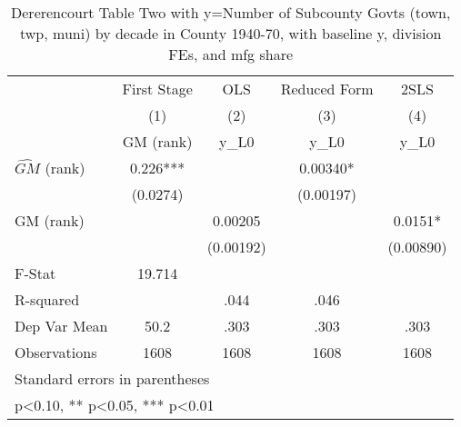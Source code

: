 \begin{table}[htbp]\centering
\def\sym#1{\ifmmode^{#1}\else\(^{#1}\)\fi}
\caption{Dererencourt Table Two with y=Number of Subcounty Govts (town, twp, muni) by decade in County 1940-70, with baseline y, division FEs, and mfg share}
\begin{tabular}{l*{4}{c}}
\toprule
                    & First Stage   &         OLS   &Reduced Form   &        2SLS   \\
                    &\multicolumn{1}{c}{(1)}&\multicolumn{1}{c}{(2)}&\multicolumn{1}{c}{(3)}&\multicolumn{1}{c}{(4)}\\
                    &\multicolumn{1}{c}{GM  (rank)}&\multicolumn{1}{c}{y\_L0}&\multicolumn{1}{c}{y\_L0}&\multicolumn{1}{c}{y\_L0}\\
\midrule
$\hat{GM}$ (rank)   &       0.226***&               &     0.00340*  &               \\
                    &    (0.0274)   &               &   (0.00197)   &               \\
\addlinespace
GM  (rank)          &               &     0.00205   &               &      0.0151*  \\
                    &               &   (0.00192)   &               &   (0.00890)   \\
\midrule
F-Stat              &      19.714   &               &               &               \\
R-squared           &               &        .044   &        .046   &               \\
Dep Var Mean        &        50.2   &        .303   &        .303   &        .303   \\
Observations        &        1608   &        1608   &        1608   &        1608   \\
\bottomrule
\multicolumn{5}{l}{\footnotesize Standard errors in parentheses}\\
\multicolumn{5}{l}{\footnotesize * p<0.10, ** p<0.05, *** p<0.01}\\
\end{tabular}
\end{table}
